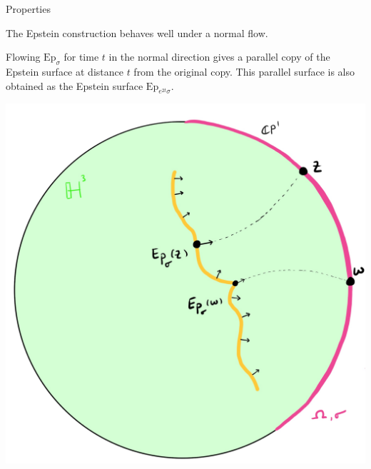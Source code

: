 \documentclass[professionalfont]{beamer}
\begin{document}
\begin{frame}{Properties}

The Epstein construction behaves well under a normal flow. 

Flowing $\mathrm{Ep}_\sigma$ for time $t$ in the normal direction gives a parallel copy of the Epstein surface at distance $t$ from the original copy. This parallel surface is also obtained as the Epstein surface $\mathrm{Ep}_{e^{2t}\sigma}$.

\centering\includegraphics[scale=0.09]{Parallel-8.jpg}

\end{frame}


\end{document}
